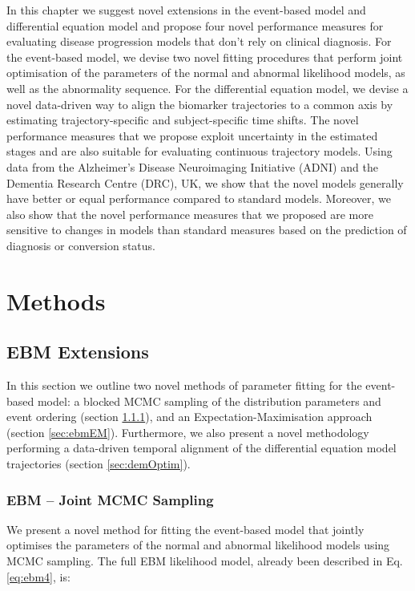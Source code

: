 In this chapter we suggest novel extensions in the event-based model and differential equation model and propose four novel performance measures for evaluating disease progression models that don't rely on clinical diagnosis. For the event-based model, we devise two novel fitting procedures that perform joint optimisation of the parameters of the normal and abnormal likelihood models, as well as the abnormality sequence. For the differential equation model, we devise a novel data-driven way to align the biomarker trajectories to a common axis by estimating trajectory-specific and subject-specific time shifts. The novel performance measures that we propose exploit uncertainty in the estimated stages and are also suitable for evaluating continuous trajectory models. Using data from the Alzheimer's Disease Neuroimaging Initiative (ADNI) and the Dementia Research Centre (DRC), UK, we show that the novel models generally have better or equal performance compared to standard models. Moreover, we also show that the novel performance measures that we proposed are more sensitive to changes in models than standard measures based on the prediction of diagnosis or conversion status. 

\section{Methods}

\subsection{EBM Extensions}

In this section we outline two novel methods of parameter fitting for the event-based model: a blocked MCMC sampling of the distribution parameters and event ordering (section \ref{sec:simultSampling}), and an Expectation-Maximisation approach (section \ref{sec:ebmEM}). Furthermore, we also present a novel methodology performing a data-driven temporal alignment of the differential equation model trajectories (section \ref{sec:demOptim}). 

\subsubsection{EBM -- Joint MCMC Sampling}
\label{sec:simultSampling}

We present a novel method for fitting the event-based model that jointly optimises the parameters of the normal and abnormal likelihood models using MCMC sampling. The full EBM likelihood model, already been described in Eq. \ref{eq:ebm4}, is:

